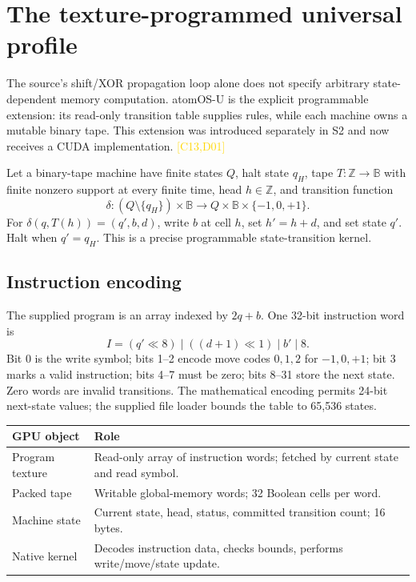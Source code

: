 \documentclass[11pt,a4paper]{article}
\newcommand{\corr}[1]{\textcolor{gold}{\textsf{[#1]}}}
\newcommand{\B}{\mathbb B}
\newcommand{\Z}{\mathbb Z}
\begin{document}
\section{The texture-programmed universal profile}\label{sec:universal}
The source's shift/XOR propagation loop alone does not specify arbitrary state-dependent memory computation. atomOS-U is the explicit programmable extension: its read-only transition table supplies rules, while each machine owns a mutable binary tape. This extension was introduced separately in S2 and now receives a CUDA implementation. \corr{C13,D01}

Let a binary-tape machine have finite states $Q$, halt state $q_H$, tape $T:\Z\to\B$ with finite nonzero support at every finite time, head $h\in\Z$, and transition function
\begin{equation}
 \delta: (Q\setminus\{q_H\})\times\B\to Q\times\B\times\{-1,0,+1\}.
\end{equation}
For $\delta(q,T(h))=(q',b,d)$, write $b$ at cell $h$, set $h'=h+d$, and set state $q'$. Halt when $q'=q_H$. This is a precise programmable state-transition kernel.

\subsection{Instruction encoding}
The supplied program is an array indexed by $2q+b$. One 32-bit instruction word is
\begin{equation}
 I=(q'\ll8)\mathbin{|}((d+1)\ll1)\mathbin{|}b'\mathbin{|}8.
\end{equation}
Bit 0 is the write symbol; bits 1--2 encode move codes $0,1,2$ for $-1,0,+1$; bit 3 marks a valid instruction; bits 4--7 must be zero; bits 8--31 store the next state. Zero words are invalid transitions. The mathematical encoding permits 24-bit next-state values; the supplied file loader bounds the table to 65,536 states.

\small
\begin{tabularx}{\textwidth}{@{}P{32mm}Y@{}}\toprule
\textbf{GPU object} & \textbf{Role}\\\midrule
Program texture & Read-only array of instruction words; fetched by current state and read symbol.\\
Packed tape & Writable global-memory words; 32 Boolean cells per word.\\
Machine state & Current state, head, status, committed transition count; 16 bytes.\\
Native kernel & Decodes instruction data, checks bounds, performs write/move/state update.\\\bottomrule
\end{tabularx}\normalsize
\end{document}
